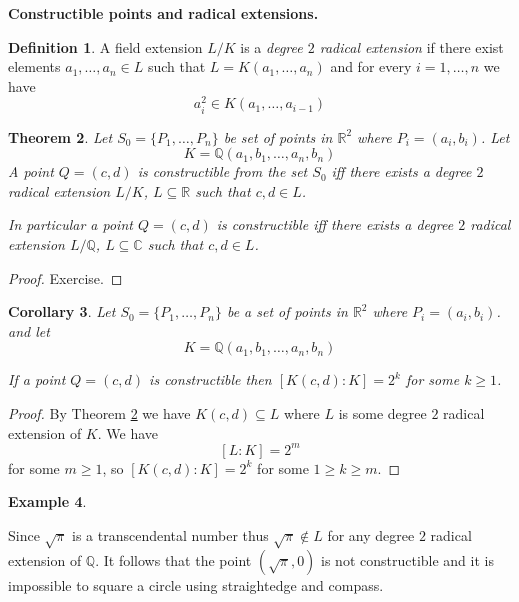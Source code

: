 \documentclass[12pt, letterpaper, oneside]{article}
\theoremstyle{plain}
\newtheorem{theorem}{Theorem}[section]
\newtheorem{corollary}[theorem]{Corollary}
\theoremstyle{definition}
\newtheorem{definition}[theorem]{Definition}
\newtheorem{example}[theorem]{Example}
\newcommand{\Q}{{\mathbb Q}}
\newcommand{\R}{{\mathbb R}}
\newcommand{\C}{{\mathbb C}}
\newcommand{\vs}{\vskip 5mm}
\begin{document}
\newpage


\textbf{Constructible points and radical extensions.}

\begin{definition}
A field extension $L/K$ is a \emph{degree $2$ radical extension}  if there exist elements 
$a_{1}, \dots, a_{n}\in L$ such that $L = K(a_{1}, \dots, a_{n})$ and for every $i=1, \dots, n$
we have
$$a_{i}^{2}\in K(a_{1}, \dots, a_{i-1})$$  
\end{definition}


\vs\vs


\begin{theorem}
\label{THM_CONSTRUCTIBILITY}
Let $S_{0} = \{P_{1}, \dots, P_{n}\}$ be set of points in $\R^{2}$ where $P_{i} = (a_{i}, b_{i})$.
Let
$$K = \Q(a_{1}, b_{1}, \dots, a_{n}, b_{n})$$
A point $Q = (c, d)$ is constructible from the set $S_{0}$ iff there exists a degree $2$ 
radical extension $L/K$, $L\subseteq \R$ such that $c, d\in L$. 

In particular a point $Q=(c, d)$ is constructible iff   there exists a degree $2$ 
radical extension $L/\Q$, $L\subseteq \C$ such that $c, d\in L$.
\end{theorem}

\vs

\begin{proof}
Exercise. 
\end{proof}

\vs\vs


\begin{corollary}
\label{COR_CONSTRUCTIBILITY}
Let $S_{0} = \{P_{1}, \dots, P_{n}\}$ be a set of points in $\R^{2}$ where $P_{i} = (a_{i}, b_{i})$.
and let
$$K = \Q(a_{1}, b_{1}, \dots, a_{n}, b_{n})$$

If a point $Q= (c, d)$ is constructible  then $[K(c, d): K] = 2^{k}$ for some $k\geq 1$. 
\end{corollary}


\vs 

\begin{proof}
By Theorem \ref{THM_CONSTRUCTIBILITY} we have $K(c, d) \subseteq L$ where 
$L$ is some degree $2$ radical extension of $K$. We have 
$$[L:K] = 2^{m}$$
for some $m\geq 1$, so $[K(c, d):K] = 2^{k}$ for some $1\geq k \geq m$. 

\end{proof}

\vs

\begin{example}  \ 

Since $\sqrt{\pi}$ is a transcendental number thus $\sqrt{\pi}\not\in L$ for any 
degree $2$ radical extension of $\Q$. It follows that the point $(\sqrt{\pi}, 0)$
is not constructible and it is impossible to square a circle using straightedge and 
compass.  
\end{example}
\end{document}
